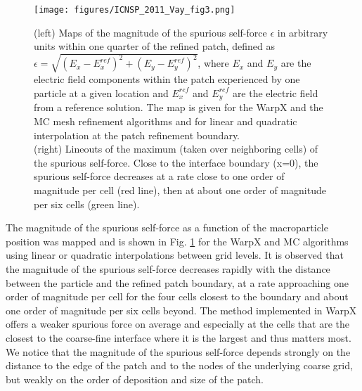 \begin{figure}[htb]
  \centering
  \texttt{[image: figures/ICNSP\_2011\_Vay\_fig3.png]}
  \caption{(left) Maps of the magnitude of the spurious self-force $\epsilon$ in arbitrary units within one quarter of the refined patch, defined as $\epsilon=\sqrt{(E_x-E_x^{ref})^2+(E_y-E_y^{ref})^2}$, where $E_x$ and $E_y$ are the electric field components within the patch experienced by one particle at a given location and $E_x^{ref}$ and $E_y^{ref}$ are the electric field from a reference solution. The map is given for the WarpX and the MC mesh refinement algorithms and for linear and quadratic interpolation at the patch refinement boundary. \\(right) Lineouts of the maximum (taken over neighboring cells) of the spurious self-force. Close to the interface boundary (x=0), the spurious self-force decreases at a rate close to one order of magnitude per cell (red line), then at about one order of magnitude per six cells (green line).}
  \label{fig:ESselfforcemap}
\end{figure}
The magnitude of the spurious self-force as a function of the macroparticle position was mapped and is shown in Fig. \ref{fig:ESselfforcemap} for the WarpX and MC algorithms using linear or quadratic interpolations between grid levels. It is observed that the magnitude of the spurious self-force decreases rapidly with the distance between the particle and the refined patch boundary, at a rate approaching one order of magnitude per cell for the four cells closest to the boundary and about one order of magnitude per six cells beyond. The method implemented in WarpX offers a weaker spurious force on average and especially at the cells that are the closest to the coarse-fine interface where it is the largest and thus matters most. 
We notice that the magnitude of the spurious self-force depends strongly on the distance to the edge of the patch and to the nodes of the underlying coarse grid, but weakly on the order of deposition and size of the patch.

